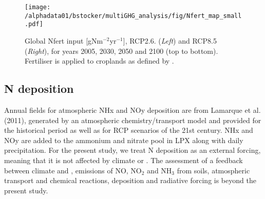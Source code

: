 \documentclass{myreport}
\begin{document}
\begin{figure}[ht!]
\begin{center}
\texttt{[image: /alphadata01/bstocker/multiGHG\_analysis/fig/Nfert\_map\_small.pdf]}
\end{center}
\caption{Global Nfert input [gNm$^{-2}$yr$^{-1}$], RCP2.6. ({\sl Left}) and RCP8.5 ({\sl Right}), for years 2005, 2030, 2050 and 2100 (top to bottom). Fertiliser is applied to croplands as defined by \cite{hurtt06gcb}.}
\label{fig:nfertmaps}
\end{figure}
\clearpage

\subsection{N deposition}
\label{sec:nfert}

Annual fields for atmospheric NHx and NOy deposition are from Lamarque et al. (2011)\cite{lamarque11cc}, generated by an atmospheric chemistry/transport model and provided for the historical period as well as for RCP scenarios of the 21st century. NHx and NOy are added to the ammonium and nitrate pool in LPX along with daily precipitation. For the present study, we treat N deposition as an external forcing, meaning that it is not affected by climate or \coo . The assessment of a feedback between climate and \coo , emissions of NO, NO$_2$ and NH$_3$ from soils, atmospheric transport and chemical reactions, deposition and radiative forcing is beyond the present study.
\end{document}
